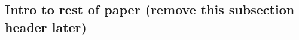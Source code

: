 \documentclass[%
preprint,                                  %
nofootinbib,
 amsmath,amssymb,
 aps,
]{revtex4-1}
\begin{document}










\subsection{\label{sec:intro.end}Intro to rest of paper (remove this subsection header later)}

\end{document}
